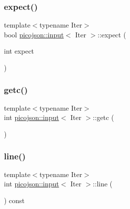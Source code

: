 \subsubsection{\texorpdfstring{expect()}{expect()}}
{\footnotesize\ttfamily template$<$typename Iter$>$ \\
bool \hyperlink{classpicojson_1_1input}{picojson\+::input}$<$ Iter $>$\+::expect (\begin{DoxyParamCaption}\item[{int}]{expect }\end{DoxyParamCaption})\hspace{0.3cm}{\ttfamily [inline]}}

\hypertarget{classpicojson_1_1input_a3e8ba0b09a989efa0dc583096984ea8e}{}\label{classpicojson_1_1input_a3e8ba0b09a989efa0dc583096984ea8e} 
\subsubsection{\texorpdfstring{getc()}{getc()}}
{\footnotesize\ttfamily template$<$typename Iter$>$ \\
int \hyperlink{classpicojson_1_1input}{picojson\+::input}$<$ Iter $>$\+::getc (\begin{DoxyParamCaption}{ }\end{DoxyParamCaption})\hspace{0.3cm}{\ttfamily [inline]}}

\hypertarget{classpicojson_1_1input_a5852aded6d48e28542f23fe0083a51fa}{}\label{classpicojson_1_1input_a5852aded6d48e28542f23fe0083a51fa} 
\subsubsection{\texorpdfstring{line()}{line()}}
{\footnotesize\ttfamily template$<$typename Iter$>$ \\
int \hyperlink{classpicojson_1_1input}{picojson\+::input}$<$ Iter $>$\+::line (\begin{DoxyParamCaption}{ }\end{DoxyParamCaption}) const\hspace{0.3cm}{\ttfamily [inline]}}

\hypertarget{classpicojson_1_1input_ad15f360122daf49ddf7a2a8591fa4364}{}\label{classpicojson_1_1input_ad15f360122daf49ddf7a2a8591fa4364} 
